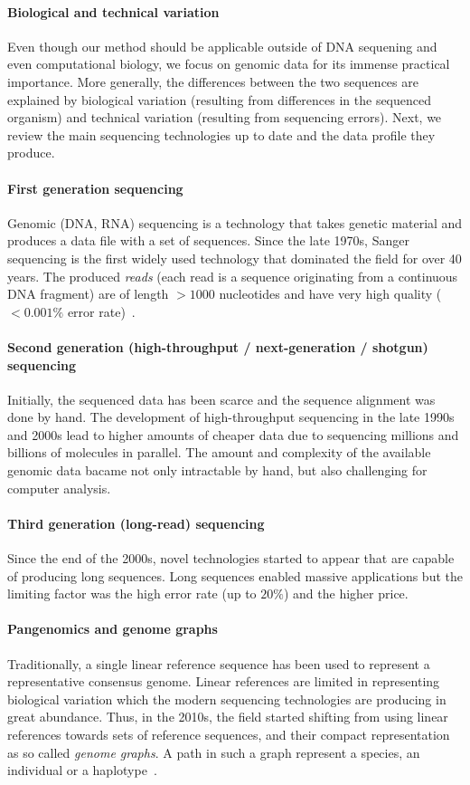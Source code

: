 \paragraph{Biological and technical variation}
Even though our method should be applicable outside of DNA sequening and even
computational biology, we focus on genomic data for its immense practical
importance. More generally, the differences between the two sequences are
explained by biological variation (resulting from differences in the sequenced
organism) and technical variation (resulting from sequencing errors). Next, we
review the main sequencing technologies up to date and the data profile they
produce.

\paragraph{First generation sequencing}
Genomic (DNA, RNA) sequencing is a technology that takes genetic material and
produces a data file with a set of sequences. Since the late 1970s, Sanger
sequencing is the first widely used technology that dominated the field for over
40 years. The produced \emph{reads} (each read is a sequence originating from a
continuous DNA fragment) are of length $>1000$ nucleotides and have very high
quality ($<0.001\%$ error rate)~\citep{shendure2008next}.

\paragraph{Second generation (high-throughput / next-generation / shotgun) sequencing}
Initially, the sequenced data has been scarce and the sequence alignment was
done by hand. The development of high-throughput sequencing in the late 1990s
and 2000s lead to higher amounts of cheaper data due to sequencing millions and
billions of molecules in parallel. The amount and complexity of the available
genomic data bacame not only intractable by hand, but also challenging for
computer analysis.

\paragraph{Third generation (long-read) sequencing}
Since the end of the 2000s, novel technologies started to appear that are
capable of producing long sequences. Long sequences enabled massive applications
but the limiting factor was the high error rate (up to $20\%$) and the higher
price.

\paragraph{Pangenomics and genome graphs}
Traditionally, a single linear reference sequence has been used to represent a
representative consensus genome. Linear references are limited in representing
biological variation which the modern sequencing technologies are producing in
great abundance. Thus, in the 2010s, the field started shifting from using
linear references towards sets of reference sequences, and their compact
representation as so called \emph{genome graphs}. A path in such a graph
represent a species, an individual or a
haplotype~\cite{dilthey_improved_2015,paten_genome_2017}.


